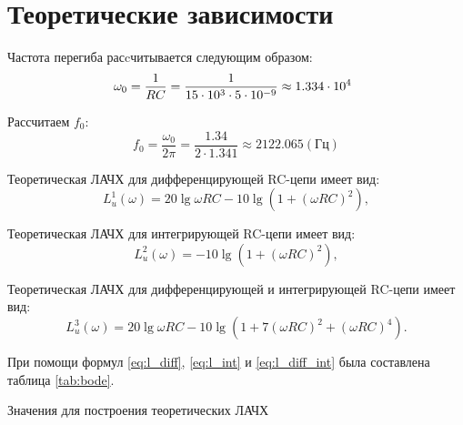 \section{Теоретические зависимости}

Частота перегиба расcчитывается следующим образом:
\begin{equation}
\omega_0 = \frac{1}{RC} = \frac{1}{15 \cdot 10^3 \cdot 5 \cdot 10^{-9}} \approx 1.334 \cdot 10^4 \hspace*{2mm}
\end{equation}

Рассчитаем $f_0$: 
\begin{equation}
f_0 = \frac{\omega_0}{2 \pi} = \frac{1.34}{2\cdot1.341} \approx 2122.065 (\text{Гц})
\end{equation}

Теоретическая ЛАЧХ для дифференцирующей RC-цепи имеет вид:
\begin{equation}\label{eq:l_diff}
L_u^1(\omega) = 20\lg \omega RC - 10\lg (1+(\omega RC)^2),
\end{equation}

Теоретическая ЛАЧХ для интегрирующей RC-цепи имеет вид:
\begin{equation}\label{eq:l_int}
L_u^2(\omega) = -10\lg (1+(\omega RC)^2),
\end{equation}

Теоретическая ЛАЧХ для дифференцирующей и интегрирующей RC-цепи имеет вид:
\begin{equation}\label{eq:l_diff_int}
L_u^3(\omega) = 20\lg \omega RC - 10\lg (1+7(\omega RC)^2 + (\omega RC)^4).
\end{equation}

При помощи формул \ref{eq:l_diff}, \ref{eq:l_int} и \ref{eq:l_diff_int} была составлена таблица \ref{tab:bode}.

\begin{table}[H]
\begin{center}
	\caption{Значения для построения теоретических ЛАЧХ}
	\label{tab:bode}
	\def\tabcolsep{17pt}
\end{center}
\end{table}

